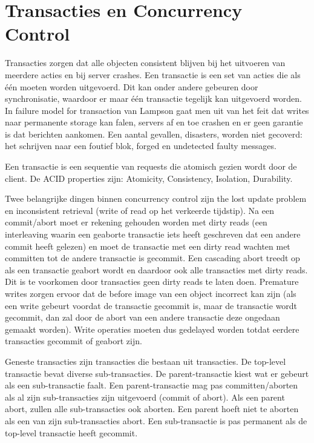 \documentclass[../samenvatting.tex]{subfiles}
\begin{document}
\chapter{Transacties en Concurrency Control}
Transacties zorgen dat alle objecten consistent blijven bij het uitvoeren van meerdere acties en bij server crashes. Een transactie is een set van acties die als één moeten worden uitgevoerd. Dit kan onder andere gebeuren door synchronisatie, waardoor er maar één transactie tegelijk kan uitgevoerd worden. In failure model for transaction van Lampson gaat men uit van het feit dat writes naar permanente storage kan falen, servers af en toe crashen en er geen garantie is dat berichten aankomen. Een aantal gevallen, disasters, worden niet gecoverd: het schrijven naar een foutief blok, forged en undetected faulty messages.

Een transactie is een sequentie van requests die atomisch gezien wordt door de client. De ACID properties zijn: Atomicity, Consistency, Isolation, Durability. 

Twee belangrijke dingen binnen concurrency control zijn the lost update problem en inconsistent retrieval (write of read op het verkeerde tijdstip). Na een commit/abort moet er rekening gehouden worden met dirty reads (een interleaving waarin een geaborte transactie iets heeft geschreven dat een andere commit heeft gelezen) en moet de transactie met een dirty read wachten met committen tot de andere transactie is gecommit. Een cascading abort treedt op als een transactie geabort wordt en daardoor ook alle transacties met dirty reads. Dit is te voorkomen door transacties geen dirty reads te laten doen. Premature writes zorgen ervoor dat de before image van een object incorrect kan zijn (als een write gebeurt voordat de transactie gecommit is, maar de transactie wordt gecommit, dan zal door de abort van een andere transactie deze ongedaan gemaakt worden). Write operaties moeten dus gedelayed worden totdat eerdere transacties gecommit of geabort zijn.

Geneste transacties zijn transacties die bestaan uit transacties. De top-level transactie bevat diverse sub-transacties. De parent-transactie kiest wat er gebeurt als een sub-transactie faalt. Een parent-transactie mag pas committen/aborten als al zijn sub-transacties zijn uitgevoerd (commit of abort). Als een parent abort, zullen alle sub-transacties ook aborten. Een parent hoeft niet te aborten als een van zijn sub-transacties abort. Een sub-transactie is pas permanent als de top-level transactie heeft gecommit.
\end{document}
